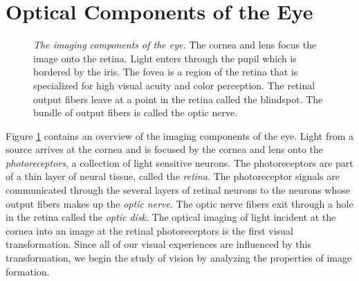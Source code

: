 \section{Optical Components of the Eye}
\begin{figure}
\centerline {
}
\caption[EyeBall From Salzman]{
{\em The imaging components of the eye.}
The cornea and lens focus the image onto the retina.
Light enters through
the pupil which is bordered by the iris.
The fovea is a region of the retina that is specialized
for high visual acuity and color perception.
The retinal output fibers leave at a point in the
retina called the blindspot.
The bundle of output fibers is called the optic nerve.
}
\label{f1:eyeball}
\end{figure}
Figure \ref{f1:eyeball}
contains an overview of the imaging components of the eye.
Light from a source arrives at the cornea
and is focused by the cornea and lens
onto the {\em photoreceptors},
a collection of light sensitive neurons.
The photoreceptors are part of a thin
layer of neural tissue, called the {\em retina}.
The photoreceptor signals are communicated through the 
several layers of retinal neurons 
to the neurons whose output fibers makes up the {\em optic nerve}.
The optic nerve fibers exit through a hole in the
retina called the {\em optic disk}.
The optical imaging of light incident at the cornea
into an image at the retinal photoreceptors
is the first visual transformation.
Since all of our visual experiences are influenced by
this transformation, we begin the study of vision
by analyzing the properties of image formation.

